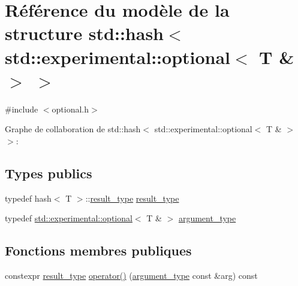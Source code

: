 \hypertarget{structstd_1_1hash_3_01std_1_1experimental_1_1optional_3_01_t_01_6_01_4_01_4}{}\section{Référence du modèle de la structure std\+:\+:hash$<$ std\+:\+:experimental\+:\+:optional$<$ T \& $>$ $>$}
\label{structstd_1_1hash_3_01std_1_1experimental_1_1optional_3_01_t_01_6_01_4_01_4}


{\ttfamily \#include $<$optional.\+h$>$}



Graphe de collaboration de std\+:\+:hash$<$ std\+:\+:experimental\+:\+:optional$<$ T \& $>$ $>$\+:
\subsection*{Types publics}
\begin{DoxyCompactItemize}
\item 
typedef hash$<$ T $>$\+::\hyperlink{structstd_1_1hash_3_01std_1_1experimental_1_1optional_3_01_t_01_6_01_4_01_4_acfb996ccc0604598b856ff0b73abf1a0}{result\+\_\+type} \hyperlink{structstd_1_1hash_3_01std_1_1experimental_1_1optional_3_01_t_01_6_01_4_01_4_acfb996ccc0604598b856ff0b73abf1a0}{result\+\_\+type}
\item 
typedef \hyperlink{classstd_1_1experimental_1_1optional}{std\+::experimental\+::optional}$<$ T \& $>$ \hyperlink{structstd_1_1hash_3_01std_1_1experimental_1_1optional_3_01_t_01_6_01_4_01_4_ab5e4cdb491b0c3833fa266cdf95a26f8}{argument\+\_\+type}
\end{DoxyCompactItemize}
\subsection*{Fonctions membres publiques}
\begin{DoxyCompactItemize}
\item 
constexpr \hyperlink{structstd_1_1hash_3_01std_1_1experimental_1_1optional_3_01_t_01_6_01_4_01_4_acfb996ccc0604598b856ff0b73abf1a0}{result\+\_\+type} \hyperlink{structstd_1_1hash_3_01std_1_1experimental_1_1optional_3_01_t_01_6_01_4_01_4_a7d500e8beb4c7420f49f73ffd68e0fac}{operator()} (\hyperlink{structstd_1_1hash_3_01std_1_1experimental_1_1optional_3_01_t_01_6_01_4_01_4_ab5e4cdb491b0c3833fa266cdf95a26f8}{argument\+\_\+type} const \&arg) const
\end{DoxyCompactItemize}


